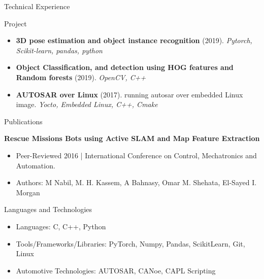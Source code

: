 \documentclass[]{mcdowellcv}
\begin{document}
	\begin{cvsection}{Technical Experience}
		\begin{cvsubsection}{Project}{}{}
			\begin{itemize}
				\item \textbf{3D pose estimation and object instance recognition} (2019). \textit{Pytorch, Scikit-learn, pandas, python}
				\item \textbf{Object Classification, and detection using HOG features and Random forests} (2019). \textit{OpenCV, C++}
				\item \textbf{AUTOSAR over Linux} (2017). running autosar over embedded Linux image. \textit{Yocto, Embedded Linux, C++, Cmake}
			\end{itemize}
		\end{cvsubsection}		
	\end{cvsection}
	
	\begin{cvsection}{Publications}
		\begin{cvsubsection}{}{}{}
			\textbf{Rescue Missions Bots using Active SLAM and Map Feature Extraction}
			\begin{itemize}
				\item Peer-Reviewed 2016 | International Conference on Control, Mechatronics and Automation.
				\item Authors: M Nabil,  M. H. Kassem, A Bahnasy, Omar M. Shehata, El-Sayed I. Morgan
			\end{itemize}
		\end{cvsubsection}
	\end{cvsection}
	
	\begin{cvsection}{Languages and Technologies}
		\begin{cvsubsection}{}{}{}	
			\begin{itemize}
				\item Languages: C, C++, Python
				\item Tools/Frameworks/Libraries: PyTorch, Numpy, Pandas, ScikitLearn, Git, Linux
				\item Automotive Technologies: AUTOSAR, CANoe, CAPL Scripting
			\end{itemize}
		\end{cvsubsection}
	\end{cvsection}
	
\end{document}

